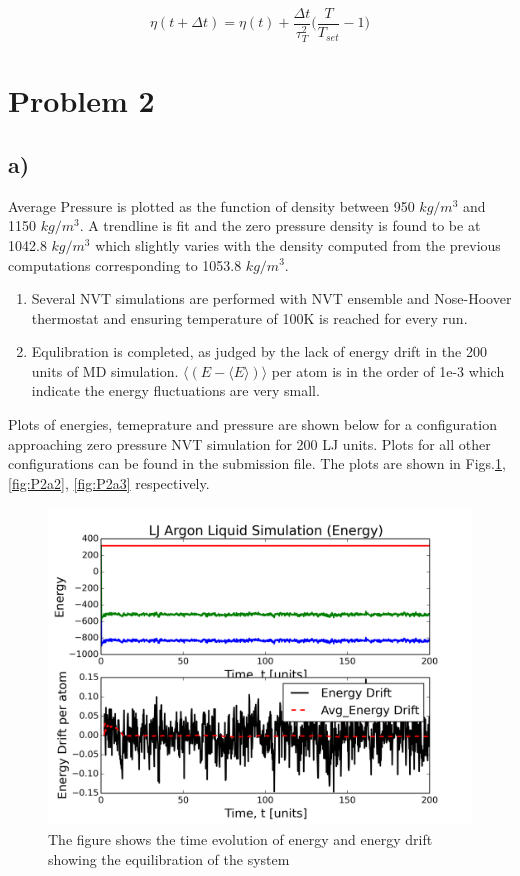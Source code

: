 \documentclass{article}
\begin{document}
\begin{equation}
\boxed{ \eta(t+\Delta t) = \eta(t) + \frac{\Delta t}{\tau^2_{T}} \Big(\frac{T}{T_{set}} - 1\Big) }
\end{equation}

\section{Problem 2}
\label{sec-2}
\subsection{a)}
\label{sec-2-1}

Average Pressure is plotted as the function of density between 950 $kg/m^3$ and 1150 $kg/m^3$. A trendline is fit and the zero pressure density is found to be at 1042.8 $kg/m^3$ which slightly varies with the density computed from the previous computations corresponding to 1053.8 $kg/m^3$.

\begin{enumerate}
\item Several NVT simulations are performed with NVT ensemble and Nose-Hoover thermostat and ensuring temperature of 100K is reached for every run.

\item Equlibration is completed, as judged by the lack of energy drift in the 200 units of MD simulation. $\big\langle (E-\langle E \rangle) \big\rangle$ per atom is in the order of 1e-3 which indicate the energy fluctuations are very small.
\end{enumerate}

Plots of energies, temeprature and pressure are shown below for a configuration approaching zero pressure NVT simulation for 200 LJ units. Plots for all other configurations can be found in the submission file. The plots are shown in Figs.\ref{fig:P2a1}, \ref{fig:P2a2}, \ref{fig:P2a3} respectively.

\begin{figure}[htb]
\centering
\includegraphics[width=.9\linewidth]{./V-4/LJ-md-Ener.png}
\caption{\label{fig:P2a1}The figure shows the time evolution of energy and energy drift showing the equilibration of the system}
\end{figure}
\end{document}

